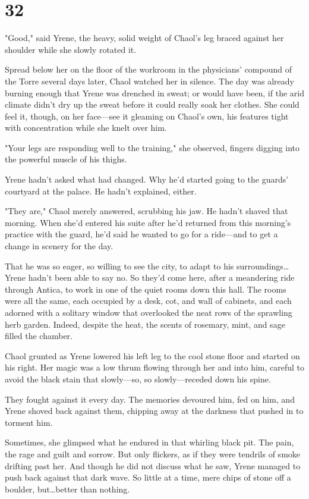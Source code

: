 
\chapter{32}

"Good," said Yrene, the heavy, solid weight of Chaol's leg braced against her shoulder while she slowly rotated it.

Spread below her on the floor of the workroom in the physicians' compound of the Torre several days later, Chaol watched her in silence.
The day was already burning enough that Yrene was drenched in sweat; or would have been, if the arid climate didn't dry up the sweat before it could really soak her clothes.
She could feel it, though, on her face---see it gleaming on Chaol's own, his features tight with concentration while she knelt over him.

"Your legs are responding well to the training," she observed, fingers digging into the powerful muscle of his thighs.

Yrene hadn't asked what had changed.
Why he'd started going to the guards' courtyard at the palace.
He hadn't explained, either.

"They are," Chaol merely answered, scrubbing his jaw.
He hadn't shaved that morning.
When she'd entered his suite after he'd returned from this morning's practice with the guard, he'd said he wanted to go for a ride---and to get a change in scenery for the day.

That he was so eager, so willing to see the city, to adapt to his surroundings\ldots Yrene hadn't been able to say no.
So they'd come here, after a meandering ride through Antica, to work in one of the quiet rooms down this hall.
The rooms were all the same, each occupied by a desk, cot, and wall of cabinets, and each adorned with a solitary window that overlooked the neat rows of the sprawling herb garden.
Indeed, despite the heat, the scents of rosemary, mint, and sage filled the chamber.

Chaol grunted as Yrene lowered his left leg to the cool stone floor and started on his right.
Her magic was a low thrum flowing through her and into him, careful to avoid the black stain that slowly---so, so slowly---receded down his spine.

They fought against it every day.
The memories devoured him, fed on him, and Yrene shoved back against them, chipping away at the darkness that pushed in to torment him.

Sometimes, she glimpsed what he endured in that whirling black pit.
The pain, the rage and guilt and sorrow.
But only flickers, as if they were tendrils of smoke drifting past her.
And though he did not discuss what he saw, Yrene managed to push back against that dark wave.
So little at a time, mere chips of stone off a boulder, but\ldots better than nothing.

